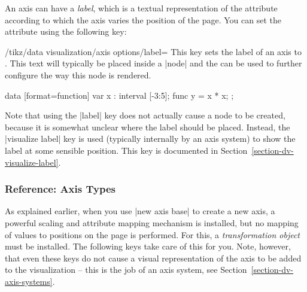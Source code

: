 An axis can have a \emph{label}, which is a textual representation of
the attribute according to which the axis varies the position of the
page. You can set the attribute using the following key:

\begin{key}{/tikz/data visualization/axis options/label=}
  This key sets the label of an axis to . This text will
  typically be placed inside a |node| and the  can be
  used to further configure the way this node is rendered. 
\begin{codeexample}[]
\tikz \datavisualization [scientific axes,
                          x axis = {label=$x$, length=2.5cm},
                          y axis = {label={[fill=blue!20]{$x^2$}}},
                          visualize as smooth line]
 data [format=function] {
   var x : interval [-3:5];
   func y = \value x * \value x;
 };
\end{codeexample}  
\end{key}

Note that using the |label| key does not actually cause a node to be
created, because it is somewhat unclear where the label should be
placed. Instead, the |visualize label| key is used (typically
internally by an axis system) to show the label at some sensible
position. This key is documented in
Section~\ref{section-dv-visualize-label}. 



\subsubsection{Reference: Axis Types}

\label{section-dv-reference-axis-types}

As explained earlier, when you use |new axis base| to create a new axis,
a powerful scaling and attribute mapping mechanism is installed, but
no mapping of values to positions on the page is performed. For this,
a \emph{transformation object} must be installed. The following keys
take care of this for you. Note, however, that even these keys do not
cause a visual representation of the axis to be added to the
visualization -- this is the job of an axis system, see
Section~\ref{section-dv-axis-systems}. 


